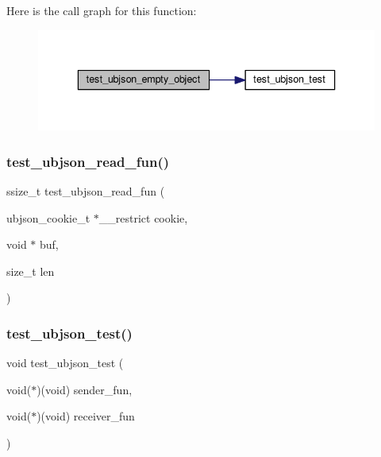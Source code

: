 Here is the call graph for this function\+:
\nopagebreak
\begin{figure}[H]
\begin{center}
\leavevmode
\includegraphics[width=336pt]{group__unittests_ga770a7e979bea402d2c2b99bded276d67_cgraph}
\end{center}
\end{figure}
\mbox{\label{group__unittests_ga8035b33fdb669d1d31033f41e4d7e291}} 
\subsubsection{\texorpdfstring{test\+\_\+ubjson\+\_\+read\+\_\+fun()}{test\_ubjson\_read\_fun()}}
{\footnotesize\ttfamily ssize\+\_\+t test\+\_\+ubjson\+\_\+read\+\_\+fun (\begin{DoxyParamCaption}\item[{ubjson\+\_\+cookie\+\_\+t $\ast$\+\_\+\+\_\+restrict}]{cookie,  }\item[{void $\ast$}]{buf,  }\item[{size\+\_\+t}]{len }\end{DoxyParamCaption})}

\mbox{\label{group__unittests_gac5fe0b001cb96b33aaf4f1b52f7d38e9}} 
\subsubsection{\texorpdfstring{test\+\_\+ubjson\+\_\+test()}{test\_ubjson\_test()}}
{\footnotesize\ttfamily void test\+\_\+ubjson\+\_\+test (\begin{DoxyParamCaption}\item[{void($\ast$)(void)}]{sender\+\_\+fun,  }\item[{void($\ast$)(void)}]{receiver\+\_\+fun }\end{DoxyParamCaption})}

